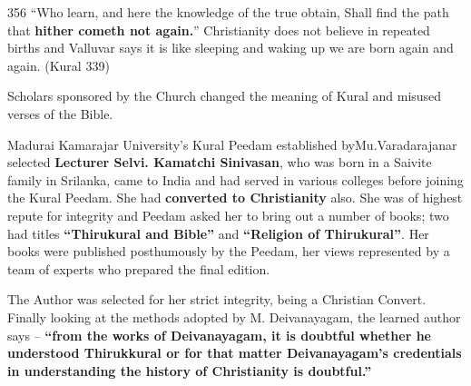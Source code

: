 356  “Who learn, and here the knowledge of the true obtain, Shall find the path that \textbf{hither cometh not again.}” Christianity does not believe in repeated births and Valluvar says it is like sleeping and waking up we are born again and again. (Kural 339)

Scholars sponsored by the Church changed the meaning of Kural and misused verses of the Bible.

Madurai Kamarajar University’s Kural Peedam established by\break Mu.Varadarajanar selected \textbf{Lecturer Selvi. Kamatchi Sinivasan}, who was born in a Saivite family in Srilanka, came to India and had served in various colleges before joining the Kural Peedam. She had \textbf{converted to Christianity} also. She was of highest repute for integrity and Peedam asked her to bring out a number of books; two had titles \textbf{“Thirukural and Bible”} and \textbf{“Religion of Thirukural”}. Her books were published posthumously by the Peedam, her views represented by a team of experts who prepared the final edition.

The Author was selected for her strict integrity, being a Christian Convert. Finally looking at the methods adopted by M. Deivanayagam, the learned author says – \textbf{“from the works of Deivanayagam, it is doubtful whether he understood Thirukkural or for that matter Deivanayagam’s credentials in understanding the history of Christianity is doubtful.”}

